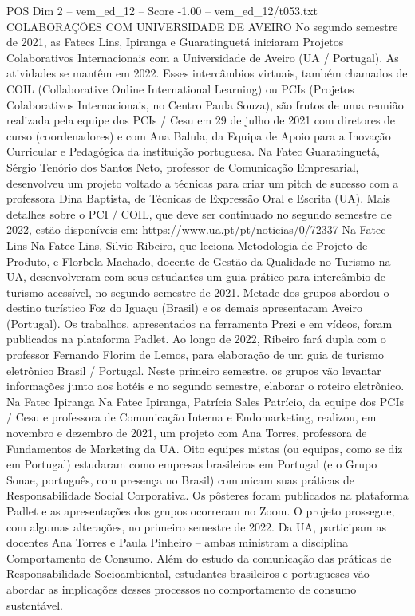 \begin{textsample}{POS Dim 2 – vem\_ed\_12 – Score -1.00 – vem\_ed\_12/t053.txt}  \label{ex:f2_pos_046}
COLABORAÇÕES COM UNIVERSIDADE DE AVEIRO No segundo semestre de 2021, as Fatecs Lins, Ipiranga e Guaratinguetá iniciaram Projetos Colaborativos Internacionais com a Universidade de Aveiro (UA / Portugal).
As atividades se mantêm em 2022.
Esses intercâmbios virtuais, também chamados de COIL (Collaborative Online International Learning) ou PCIs (Projetos Colaborativos Internacionais, no Centro Paula Souza), são frutos de uma reunião realizada pela equipe dos PCIs / Cesu em 29 de julho de 2021 com diretores de curso (coordenadores) e com Ana Balula, da Equipa de Apoio para a Inovação Curricular e Pedagógica da instituição portuguesa.
Na Fatec Guaratinguetá, Sérgio Tenório dos Santos Neto, professor de Comunicação Empresarial, desenvolveu um projeto voltado a técnicas para criar um pitch de sucesso com a professora Dina Baptista, de Técnicas de Expressão Oral e Escrita (UA).
Mais detalhes sobre o PCI / COIL, que deve ser continuado no segundo semestre de 2022, estão disponíveis em: https://www.ua.pt/pt/noticias/0/72337 Na Fatec Lins Na Fatec Lins, Silvio Ribeiro, que leciona Metodologia de Projeto de Produto, e Florbela Machado, docente de Gestão da Qualidade no Turismo na UA, desenvolveram com seus estudantes um guia prático para intercâmbio de turismo acessível, no segundo semestre de 2021.
Metade dos grupos abordou o destino turístico Foz do Iguaçu (Brasil) e os demais apresentaram Aveiro (Portugal).
Os trabalhos, apresentados na ferramenta Prezi e em vídeos, foram publicados na plataforma Padlet.
Ao longo de 2022, Ribeiro fará dupla com o professor Fernando Florim de Lemos, para elaboração de um guia de turismo eletrônico Brasil / Portugal.
Neste primeiro semestre, os grupos vão levantar informações junto aos hotéis e no segundo semestre, elaborar o roteiro eletrônico.
Na Fatec Ipiranga Na Fatec Ipiranga, Patrícia Sales Patrício, da equipe dos PCIs / Cesu e professora de Comunicação Interna e Endomarketing, realizou, em novembro e dezembro de 2021, um projeto com Ana Torres, professora de Fundamentos de Marketing da UA.
Oito equipes mistas (ou equipas, como se diz em Portugal) estudaram como empresas brasileiras em Portugal (e o Grupo Sonae, português, com presença no Brasil) comunicam suas práticas de Responsabilidade Social Corporativa.
Os pôsteres foram publicados na plataforma Padlet e as apresentações dos grupos ocorreram no Zoom.
O projeto prossegue, com algumas alterações, no primeiro semestre de 2022.
Da UA, participam as docentes Ana Torres e Paula Pinheiro – ambas ministram a disciplina Comportamento de Consumo.
Além do estudo da comunicação das práticas de Responsabilidade Socioambiental, estudantes brasileiros e portugueses vão abordar as implicações desses processos no comportamento de consumo sustentável.

\end{textsample}
